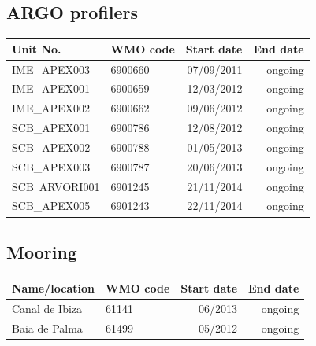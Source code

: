 \documentclass[10pt,landscape]{article}
\begin{document}
\begin{multicols}{2}
\subsection*{ARGO profilers}
\begin{table}[H]
\begin{tabular}{llrr}
\toprule
Unit No.			& WMO code	& Start date	 & End date \\
\midrule
IME\_APEX003		& 6900660	& 07/09/2011	 & ongoing \\
IME\_APEX001		& 6900659	& 12/03/2012	 & ongoing \\
IME\_APEX002		& 6900662	& 09/06/2012	 & ongoing \\
SCB\_APEX001		& 6900786	& 12/08/2012	 & ongoing \\
SCB\_APEX002		& 6900788	& 01/05/2013	 & ongoing \\
SCB\_APEX003		& 6900787	& 20/06/2013	 & ongoing \\
SCB\ ARVORI001	& 6901245	& 21/11/2014	 & ongoing \\
SCB\_APEX005		& 6901243	& 22/11/2014	 & ongoing \\
\bottomrule
\end{tabular}
\end{table}

\subsection*{Mooring}
\begin{table}[H]
\begin{tabular}{llrr}
\toprule
Name/location	& WMO code	& Start date	 & End date \\
\midrule
Canal de Ibiza	& 61141		& 06/2013		& ongoing \\ 
Baia de Palma	& 61499		& 05/2012		& ongoing \\
\bottomrule
\end{tabular}
\end{table}


\end{multicols}
\end{document}
